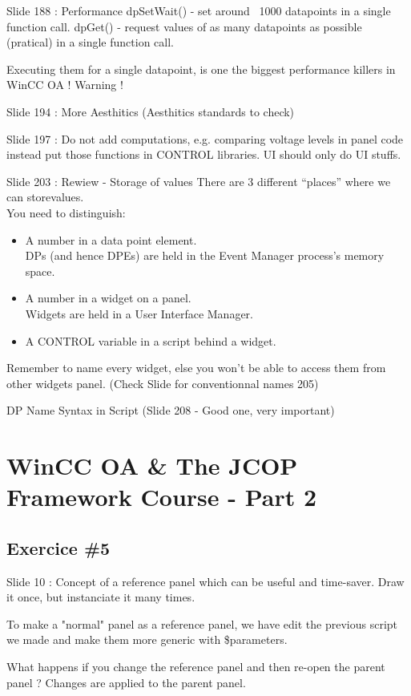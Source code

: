 \documentclass[a4paper, 10pt]{article}
\begin{document}
Slide 188 : Performance
dpSetWait() - set around ~1000 datapoints in a single function call.
dpGet() - request values of as many datapoints as possible (pratical) in a single function call.

Executing them for a single datapoint, is one the biggest performance killers in WinCC OA ! Warning !

Slide 194 : More Aesthitics (Aesthitics standards to check)

Slide 197 : Do not add computations, e.g. comparing voltage levels in panel code instead put those functions in CONTROL libraries. UI should only do UI stuffs.

Slide 203 : Rewiew - Storage of values
There are 3 different “places” where we can storevalues.\\
You need to distinguish:
\begin{itemize}
    \item A number in a data point element.\\
DPs (and hence DPEs) are held in the Event Manager process’s memory space.
    \item A number in a widget on a panel.\\
Widgets are held in a User Interface Manager.
    \item A CONTROL variable in a script behind a widget.
\end{itemize}

Remember to name every widget, else you won't be able to access them from other widgets panel.
(Check Slide for conventionnal names 205)

DP Name Syntax in Script (Slide 208 - Good one, very important)

\section{WinCC OA \&  The JCOP Framework Course - Part 2}
\subsection{Exercice \#5}
Slide 10 : Concept of a reference panel which can be useful and time-saver.
Draw it once, but instanciate it many times.

To make a "normal" panel as a reference panel, we have edit the previous script we made and make them more generic with \$parameters.

What happens if you change the reference panel and then re-open the parent panel ?
Changes are applied to the parent panel.
\end{document}
